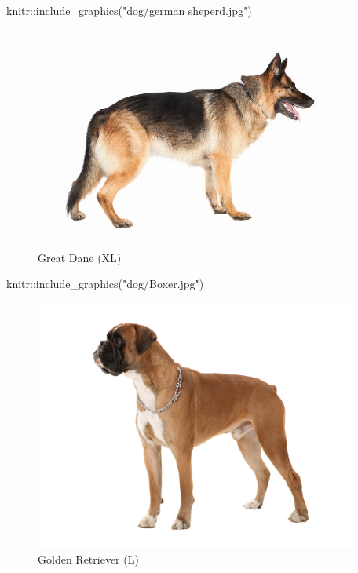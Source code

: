 \documentclass[
]{article}
\newenvironment{Shaded}{\begin{snugshade}}{\end{snugshade}}
\newcommand{\FunctionTok}[1]{\textcolor[rgb]{0.00,0.00,0.00}{#1}}
\newcommand{\NormalTok}[1]{#1}
\newcommand{\SpecialCharTok}[1]{\textcolor[rgb]{0.00,0.00,0.00}{#1}}
\newcommand{\StringTok}[1]{\textcolor[rgb]{0.31,0.60,0.02}{#1}}
\begin{document}
\begin{Shaded}
\begin{Highlighting}[]
\NormalTok{knitr}\SpecialCharTok{::}\FunctionTok{include\_graphics}\NormalTok{(}\StringTok{"dog/german sheperd.jpg"}\NormalTok{)}
\end{Highlighting}
\end{Shaded}

\begin{figure}
\includegraphics[width=400px]{dog/german sheperd} \caption{Great Dane (XL)}\label{fig:unnamed-chunk-2-3}
\end{figure}

\begin{Shaded}
\begin{Highlighting}[]
\NormalTok{knitr}\SpecialCharTok{::}\FunctionTok{include\_graphics}\NormalTok{(}\StringTok{"dog/Boxer.jpg"}\NormalTok{)}
\end{Highlighting}
\end{Shaded}

\begin{figure}
\includegraphics[width=400px]{dog/Boxer} \caption{Golden Retriever (L)}\label{fig:unnamed-chunk-2-4}
\end{figure}
\end{document}
